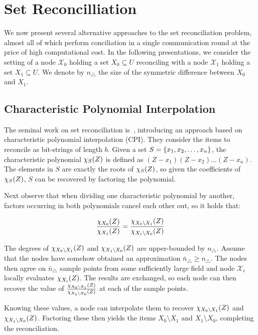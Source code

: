 \section{Set Reconcilliation}
\label{related-reconciliation}

We now present several alternative approaches to the set reconciliation problem, almost all of which perform conciliation in a single communication round at the price of high computational cost. In the following presentations, we consider the setting of a node $\mathcal{X}_0$ holding a set $X_0 \subseteq U$ reconciling with a node $\mathcal{X}_1$ holding a set $X_1 \subseteq U$. We denote by $n_{\triangle}$ the size of the symmetric difference between $X_0$ and $X_1$.

\subsection{Characteristic Polynomial Interpolation}

The seminal work on set reconciliation is~\cite{minsky2003set}, introducing an approach based on characteristic polynomial interpolation (CPI). They consider the items to reconcile as bit-strings of length $b$. Given a set $S = \{x_1, x_2, \ldots, x_n\}$, the characteristic polynomial $\chi_{S}(Z)$ is defined as $(Z - x_1)(Z - x_2)\ldots(Z - x_n)$. The elements in $S$ are exactly the roots of $\chi_{S}(Z)$, so given the coefficients of $\chi_{S}(Z)$, $S$ can be recovered by factoring the polynomial.

Next observe that when dividing one characteristic polynomial by another, factors occurring in both polynomials cancel each other out, so it holds that:

\[
\frac{\chi_{X_0}(Z)}{\chi_{X_1}(Z)} = \frac{\chi_{X_0 \setminus X_1}(Z)}{\chi_{X_1 \setminus X_0}(Z)}
\]

The degrees of $\chi_{X_0 \setminus X_1}(Z)$ and $\chi_{X_1 \setminus X_0}(Z)$ are upper-bounded by $n_{\triangle}$. Assume that the nodes have somehow obtained an approximation $\bar{n}_{\triangle} \geq n_{\triangle}$. The nodes then agree on $\bar{n}_{\triangle}$ sample points from some sufficiently large field and node $\mathcal{X}_i$ locally evaluates $\chi_{X_i}(Z)$. The results are exchanged, so each node can then recover the value of $\frac{\chi_{X_0 \setminus X_1}(Z)}{\chi_{X_1 \setminus X_0}(Z)}$ at each of the sample points.

Knowing these values, a node can interpolate them to recover $\chi_{X_0 \setminus X_1}(Z)$ and $\chi_{X_1 \setminus X_0}(Z)$. Factoring these then yields the items $X_0 \setminus X_1$ and $X_1 \setminus X_0$, completing the reconciliation.

